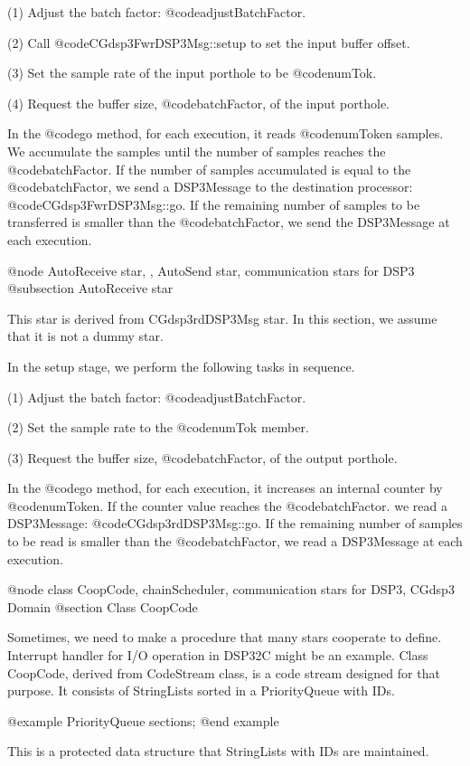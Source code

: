 {(1) Adjust the batch factor: @code{adjustBatchFactor}.

(2) Call @code{CGdsp3FwrDSP3Msg::setup} to set the input buffer offset.

(3) Set the sample rate of the input porthole to be @code{numTok}.

(4) Request the buffer size, @code{batchFactor}, of the input porthole.

In the @code{go} method, for each execution, it reads @code{numToken} samples.
We accumulate the samples until the number of samples reaches 
the @code{batchFactor}. If the number of samples accumulated is equal to the
@code{batchFactor}, we send a DSP3Message to the destination processor:
@code{CGdsp3FwrDSP3Msg::go}. If the remaining number of samples to be
transferred is smaller than the @code{batchFactor}, we send the DSP3Message
at each execution.

@node AutoReceive star, , AutoSend star, communication stars for DSP3
@subsection AutoReceive star

This star is derived from CGdsp3rdDSP3Msg star. In this section, we assume
that it is not a dummy star.

In the setup stage, we perform the following tasks in sequence.

(1) Adjust the batch factor: @code{adjustBatchFactor}.

(2) Set the sample rate to the @code{numTok} member.

(3) Request the buffer size, @code{batchFactor}, of the output porthole. 

In the @code{go} method, for each execution, it increases an internal
counter by @code{numToken}. If the counter value reaches
the @code{batchFactor}. we read a DSP3Message: @code{CGdsp3rdDSP3Msg::go}. 
If the remaining number of samples to be
read is smaller than the @code{batchFactor}, we read a DSP3Message at
each execution.

@node class CoopCode, chainScheduler, communication stars for DSP3, CGdsp3 Domain
@section Class CoopCode

Sometimes, we need to make a procedure that many stars cooperate to define.
Interrupt handler for I/O operation in DSP32C might be an example.
Class CoopCode, derived from CodeStream class, is a code stream designed for
that purpose. It consists of StringLists sorted in a PriorityQueue with IDs.

@example
PriorityQueue sections;
@end example

This is a protected data structure that StringLists with IDs are maintained.

}
